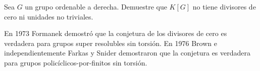 \begin{exercise}
	Sea $G$ un grupo ordenable a derecha. Demuestre que $K[G]$ no tiene divisores de
	cero ni unidades no triviales.	
\end{exercise}


En 1973 Formanek demostró que la conjetura de los divisores de cero es
verdadera para grupos super resolubles sin torsión. En 1976 Brown e independientemente
Farkas y Snider demostraron que la conjetura es verdadera para grupos policíclicos-por-finitos sin torsión.

